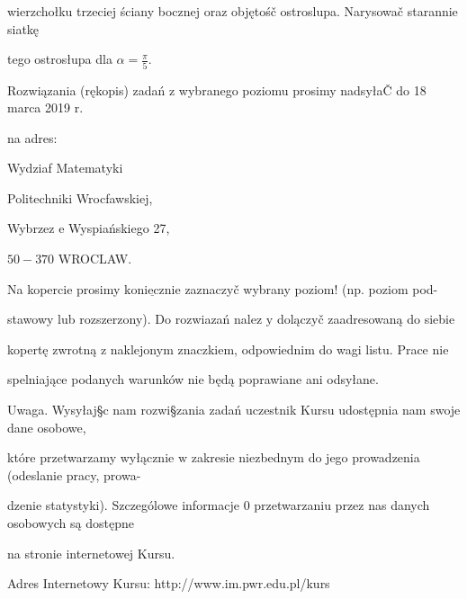 \documentclass[a4paper,12pt]{article}
\begin{document}
wierzchołku trzeciej ściany bocznej oraz objętośč ostroslupa. Narysowač starannie siatkę

tego ostrosłupa dla $\displaystyle \alpha=\frac{\pi}{5}.$

Rozwiązania (rękopis) zadań $\mathrm{z}$ wybranego poziomu prosimy nadsyłaČ do 18 marca 2019 $\mathrm{r}.$

na adres:

Wydziaf Matematyki

Politechniki Wrocfawskiej,

Wybrzez $\mathrm{e}$ Wyspiańskiego 27,

$50-370$ WROCLAW.

Na kopercie prosimy $\underline{\mathrm{k}\mathrm{o}\mathrm{n}\mathrm{i}\mathrm{e}\mathrm{c}\mathrm{z}\mathrm{n}\mathrm{i}\mathrm{e}}$ zaznaczyč wybrany poziom! (np. poziom pod-

stawowy lub rozszerzony). Do rozwiazań nalez $\mathrm{y}$ dolączyč zaadresowaną do siebie

kopertę zwrotną $\mathrm{z}$ naklejonym znaczkiem, odpowiednim do wagi listu. Prace nie

spelniające podanych warunków nie będą poprawiane ani odsyłane.

Uwaga. Wysyłaj\S c nam rozwi\S zania zadań uczestnik Kursu udostępnia nam swoje dane osobowe,

które przetwarzamy wyłącznie $\mathrm{w}$ zakresie niezbednym do jego prowadzenia (odeslanie pracy, prowa-

dzenie statystyki). Szczególowe informacje $0$ przetwarzaniu przez nas danych osobowych są dostępne

na stronie internetowej Kursu.

Adres Internetowy Kursu: http://www.im.pwr.edu.pl/kurs
\end{document}
